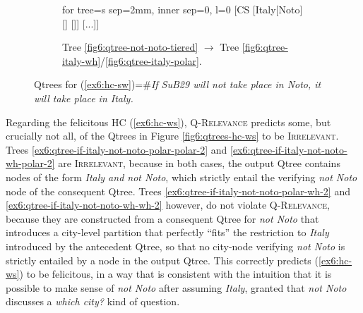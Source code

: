 \begin{figure}[H]
\begin{subfigure}[b]{.25\linewidth}
	\centering
	\scalebox{.7}
	{\begin{forest}for tree={s sep=2mm, inner sep=0, l=0}
			[CS [Italy[{Noto}] [] []]  [...]]
	\end{forest}}
	\caption{Tree \ref{fig6:qtree-not-noto-tiered} $\rightarrow$ Tree \ref{fig6:qtree-italy-wh}/\ref{fig6:qtree-italy-polar}.}\label{fig6:qtree-if-not-noto-italy-tiered-wh-2}
\end{subfigure}
\caption{Qtrees for (\ref{ex6:hc-sw})=\#\textit{If SuB29 will not take place in Noto, it will take place in Italy.}}
\end{figure}

Regarding the felicitous HC (\ref{ex6:hc-ws}), \textsc{Q-Relevance} predicts some, but crucially not all, of the Qtrees in Figure \ref{fig6:qtrees-hc-ws} to be \textsc{Irrelevant}. Trees \ref{ex6:qtree-if-italy-not-noto-polar-polar-2} and \ref{ex6:qtree-if-italy-not-noto-wh-polar-2} are \textsc{Irrelevant}, because in both cases, the output Qtree contains nodes of the form \textit{Italy and not Noto}, which strictly entail the verifying \textit{not Noto} node of the consequent Qtree. Trees \ref{ex6:qtree-if-italy-not-noto-polar-wh-2} and \ref{ex6:qtree-if-italy-not-noto-wh-wh-2} however, do not violate \textsc{Q-Relevance}, because they are constructed from a consequent Qtree for \textit{not Noto} that introduces a city-level partition that perfectly ``fits'' the restriction to \textit{Italy} introduced by the antecedent Qtree, so that no city-node verifying \textit{not Noto} is strictly entailed by a node in the output Qtree. This correctly predicts (\ref{ex6:hc-ws}) to be felicitous, in a way that is consistent with the intuition that it is possible to make sense of \textit{not Noto} after assuming \textit{Italy}, granted that \textit{not Noto} discusses a \textit{which city?} kind of question.



